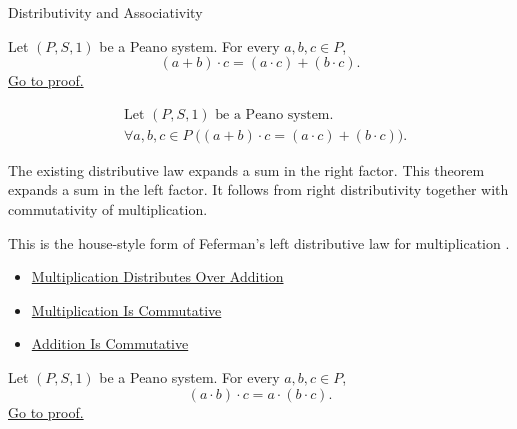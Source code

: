 \begin{topicbox}{Distributivity and Associativity}
\begin{tcolorbox}[colback=thmbox, colframe=thmborder, arc=2pt,
  left=6pt, right=6pt, top=4pt, bottom=4pt,
  title={\small\textbf{Theorem (Left Distributivity of Multiplication Over Addition)}},
  fonttitle=\small\bfseries]
\begin{theorem}
\label{thm:left-distributivity-of-multiplication-over-addition}
Let $(P,S,1)$ be a Peano system. For every $a,b,c \in P$,
\[
(a+b)\cdot c=(a\cdot c)+(b\cdot c).
\]
\hyperref[prf:left-distributivity-of-multiplication-over-addition]{Go to proof.}
\end{theorem}
\end{tcolorbox}

\begin{remark*}
\[
\begin{aligned}
&\text{Let } (P,S,1) \text{ be a Peano system.}\\
&\forall a,b,c \in P\;\bigl((a+b)\cdot c=(a\cdot c)+(b\cdot c)\bigr).
\end{aligned}
\]
\end{remark*}

\begin{remark*}[Interpretation]
The existing distributive law expands a sum in the right factor. This theorem
expands a sum in the left factor. It follows from right distributivity together
with commutativity of multiplication.
\end{remark*}

\begin{remark*}
This is the house-style form of Feferman's left distributive law for
multiplication \citep{FefermanNumberSystems1964}.
\end{remark*}

\begin{dependencies}
\begin{itemize}
  \item \hyperref[thm:multiplication-distributes-over-addition]{Multiplication Distributes Over Addition}
  \item \hyperref[thm:multiplication-commutative]{Multiplication Is Commutative}
  \item \hyperref[thm:addition-commutative]{Addition Is Commutative}
\end{itemize}
\end{dependencies}

\begin{tcolorbox}[colback=thmbox, colframe=thmborder, arc=2pt,
  left=6pt, right=6pt, top=4pt, bottom=4pt,
  title={\small\textbf{Theorem (Multiplication Is Associative)}},
  fonttitle=\small\bfseries]
\begin{theorem}
\label{thm:multiplication-associative}
Let $(P,S,1)$ be a Peano system. For every $a,b,c \in P$,
\[
(a \cdot b) \cdot c = a \cdot (b \cdot c).
\]
\hyperref[prf:multiplication-associative]{Go to proof.}
\end{theorem}
\end{tcolorbox}


\end{topicbox}
